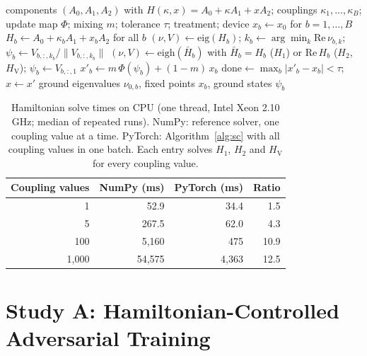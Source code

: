 \documentclass[conference]{IEEEtran}
\newcommand{\HV}{H_{\mathrm{V}}}
\begin{document}
\begin{algorithm}[t]
\caption{Batched self-consistent solve of $H_1$, $H_2$ or $\HV$ (CPU or GPU)}\label{alg:sc}
\small
\begin{algorithmic}[1]
\Require components $(A_0,A_1,A_2)$ with $H(\kappa,x)=A_0+\kappa A_1+x A_2$; couplings $\kappa_1,\dots,\kappa_B$; update map $\Phi$; mixing $m$; tolerance $\tau$; treatment; device
\State $x_b\gets x_0$ for $b=1,\dots,B$ 
\Repeat
  \State $H_b\gets A_0+\kappa_bA_1+x_bA_2$ for all $b$ 
    \State $(\nu,V)\gets\mathrm{eig}(H_b)$; $k_b\gets\arg\min_k\mathrm{Re}\,\nu_{b,k}$; $\psi_b\gets V_{b,:,k_b}/\|V_{b,:,k_b}\|$
  \Else
    \State $(\nu,V)\gets\mathrm{eigh}(\bar H_b)$ with $\bar H_b=H_b$ ($H_1$) or $\mathrm{Re}\,H_b$ ($H_2$, $\HV$); $\psi_b\gets V_{b,:,1}$
  \EndIf
  \State $x'_b\gets m\,\Phi(\psi_b)+(1-m)\,x_b$ 
  \State $\mathrm{done}\gets\max_b|x'_b-x_b|<\tau$; $x\gets x'$ 
\State \Return ground eigenvalues $\nu_{0,b}$, fixed points $x_b$, ground states $\psi_b$
\end{algorithmic}
\end{algorithm}

\begin{table}[t]
\centering
\caption{Hamiltonian solve times on CPU (one thread, Intel Xeon 2.10 GHz; median of repeated runs). NumPy: reference solver, one coupling value at a time. PyTorch: Algorithm~\ref{alg:sc} with all coupling values in one batch. Each entry solves $H_1$, $H_2$ and $\HV$ for every coupling value.}
\label{tab:solvetime}
\footnotesize
\begin{tabular}{rrrr}
\toprule
Coupling values & NumPy (ms) & PyTorch (ms) & Ratio\\
\midrule
1 & 52.9 & 34.4 & 1.5\\
5 & 267.5 & 62.0 & 4.3\\
100 & 5{,}160 & 475 & 10.9\\
1{,}000 & 54{,}575 & 4{,}363 & 12.5\\
\bottomrule
\end{tabular}
\end{table}

\section{Study A: Hamiltonian-Controlled Adversarial Training}\label{sec:studyA}
\end{document}
